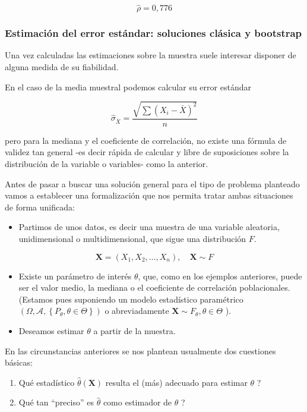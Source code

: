 \documentclass[
]{article}
\providecommand{\tightlist}{%
  \setlength{\itemsep}{0pt}\setlength{\parskip}{0pt}}
\begin{document}
\[
\hat{\rho}=0,776
\]

\subsubsection{Estimación del error estándar: soluciones clásica y bootstrap}\label{estimaciuxf3n-del-error-estuxe1ndar-soluciones-cluxe1sica-y-bootstrap}

Una vez calculadas las estimaciones sobre la muestra suele interesar disponer de alguna medida de su fiabilidad.

En el caso de la media muestral podemos calcular su error estándar

\[
\hat{\sigma}_{\bar{X}}=\frac{\sqrt{\sum\left(X_{i}-\bar{X}\right)^{2}}}{n}
\]

pero para la mediana y el coeficiente de correlación, no existe una fórmula de validez tan general -es decir rápida de calcular y libre de suposiciones sobre la distribución de la variable o variables- como la anterior.

Antes de pasar a buscar una solución general para el tipo de problema planteado vamos a establecer una formalización que nos permita tratar ambas situaciones de forma unificada:

\begin{itemize}
\tightlist
\item
  Partimos de unos datos, es decir una muestra de una variable aleatoria, unidimensional o multidimensional, que sigue una distribución \(F\).
\end{itemize}

\[
\mathbf{X}=\left(X_{1}, X_{2}, \ldots, X_{n}\right), \quad \mathbf{X} \sim F
\]

\begin{itemize}
\tightlist
\item
  Existe un parámetro de interés \(\theta\), que, como en los ejemplos anteriores, puede ser el valor medio, la mediana o el coeficiente de correlación poblacionales. (Estamos pues suponiendo un modelo estadístico paramétrico \(\left(\Omega, \mathcal{A},\left\{P_{\theta}, \theta \in \Theta\right\}\right)\) o abreviadamente \(\mathbf{X} \sim F_{\theta}, \theta \in \Theta\) ).
\item
  Deseamos estimar \(\theta\) a partir de la muestra.
\end{itemize}

En las circunstancias anteriores se nos plantean usualmente dos cuestiones básicas:

\begin{enumerate}
\def\labelenumi{\arabic{enumi}.}
\tightlist
\item
  Qué estadístico \(\hat{\theta}(\mathbf{X})\) resulta el (más) adecuado para estimar \(\theta\) ?
\item
  Qué tan ``preciso'' es \(\hat{\theta}\) como estimador de \(\theta\) ?
\end{enumerate}
\end{document}
